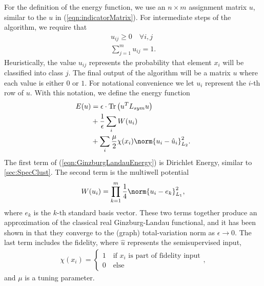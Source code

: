 \documentclass[journal]{IEEEtran}
\begin{document}
For the definition of the energy function, we use an $n \times m$ assignment
matrix $u$, similar to the $u$ in (\ref{eqn:indicatorMatrix}). For intermediate steps
of the algorithm, we require that
\begin{align}
  u_{ij} \geq 0 \quad \forall i,j \\
  \sum_{j=1}^m u_{ij} = 1.
\end{align}
Heuristically, the value $u_{ij}$ represents the probability that element $x_i$
will be classified into class $j$. The final output of the algorithm will be a
matrix $u$ where each value is either $0$ or $1$. For notational convenience we
let $u_i$ represent the $i$-th row of $u$. With this notation, we define the
energy function
\begin{align}\label{eqn:GinzburgLandauEnergy}
  E(u) &= \epsilon \cdot \text{Tr}\left(u^TL_{sym} u\right) \nonumber \\
       &+ \frac{1}{\epsilon}\sum_i W(u_i) \nonumber \\
       &+ \sum_i \frac{\mu}{2}\chi(x_i)\norm{u_i - \hat{u}_i}^2_{L_2}.
\end{align}
The first term of (\ref{eqn:GinzburgLandauEnergy}) is Dirichlet Energy, similar
to \ref{sec:SpecClust}. The second term is the multiwell potential
\begin{align}
  W(u_i) = \prod_{k=1}^{m}\frac{1}{4}\norm{u_i - e_k}_{L_1}^2,
\end{align}
where $e_k$ is the $k$-th standard basis vector. These two terms together
produce an approximation of the classical real Ginzburg-Landau functional, and
it has been shown in \cite{gennip2012} that they converge to the (graph)
total-variation norm as $\epsilon \to 0$. The last term includes the fidelity,
where $\hat{u}$ represents the semisupervised input,
\begin{align}
  \chi(x_i) = \begin{cases} 1 \quad \text{if $x_i$ is part of fidelity input}\\
    0 \quad
    \text{else}
  \end{cases},
\end{align}
and $\mu$ is a tuning parameter.
\end{document}
